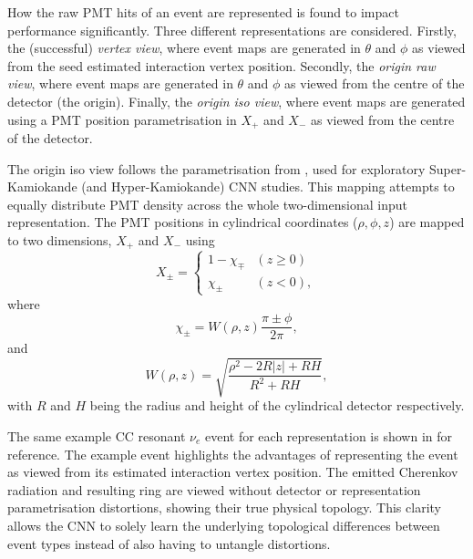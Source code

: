 How the raw PMT hits of an event are represented is found to impact performance significantly.
Three different representations are considered. Firstly, the (successful) \emph{vertex view},
where event maps are generated in $\theta$ and $\phi$ as viewed from the seed estimated
interaction vertex position. Secondly, the \emph{origin raw view}, where event maps are generated
in $\theta$ and $\phi$ as viewed from the centre of the detector (the origin). Finally, the
\emph{origin iso view}, where event maps are generated using a PMT position parametrisation in
$X_{+}$ and $X_{-}$ as viewed from the centre of the detector.

The origin iso view follows the parametrisation from , used for
exploratory Super-Kamiokande (and Hyper-Kamiokande) CNN studies. This mapping attempts to equally
distribute PMT density across the whole two-dimensional input representation. The PMT positions in
cylindrical coordinates ($\rho,\phi,z$) are mapped to two dimensions, $X_{+}$ and $X_{-}$ using
\begin{equation} %
    X_{\pm}=
    \begin{cases}
        1-\chi_{\mp} & (z \geq 0) \\
        \chi_{\pm}   & (z < 0),
    \end{cases}
    \label{eq:iso_case}
\end{equation}
where
\begin{equation} %
    \chi_{\pm}=W(\rho,z)\frac{\pi\pm\phi}{2\pi},
    \label{eq:iso_main}
\end{equation}
and
\begin{equation} %
    W(\rho,z)=\sqrt{\frac{\rho^{2}-2R|z|+RH}{R^{2}+RH}},
    \label{eq:iso_part}
\end{equation}
with $R$ and $H$ being the radius and height of the cylindrical detector respectively.

The same example CC resonant $\nu_{e}$ event for each representation is shown in
 for reference. The example event highlights the
advantages of representing the event as viewed from its estimated interaction vertex position. The
emitted Cherenkov radiation and resulting ring are viewed without detector or representation
parametrisation distortions, showing their true physical topology. This clarity allows the CNN to
solely learn the underlying topological differences between event types instead of also having to
untangle distortions.

